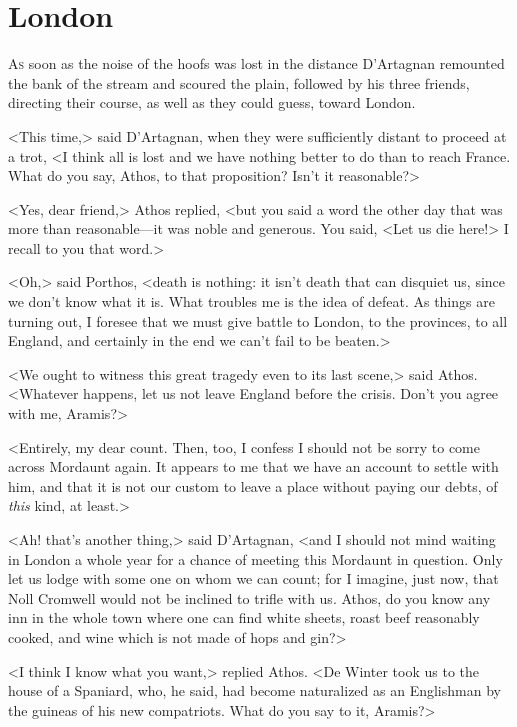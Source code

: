 \chapter{London}

 \lettrine{A}{s} soon as the noise of the hoofs was lost in the distance D'Artagnan remounted the bank of the stream and scoured the plain, followed by his three friends, directing their course, as well as they could guess, toward London.

\zz
<This time,> said D'Artagnan, when they were sufficiently distant to proceed at a trot, <I think all is lost and we have nothing better to do than to reach France. What do you say, Athos, to that proposition? Isn't it reasonable?>

<Yes, dear friend,> Athos replied, <but you said a word the other day that was more than reasonable—it was noble and generous. You said, <Let us die here!> I recall to you that word.>

<Oh,> said Porthos, <death is nothing: it isn't death that can disquiet us, since we don't know what it is. What troubles me is the idea of defeat. As things are turning out, I foresee that we must give battle to London, to the provinces, to all England, and certainly in the end we can't fail to be beaten.>

<We ought to witness this great tragedy even to its last scene,> said Athos. <Whatever happens, let us not leave England before the crisis. Don't you agree with me, Aramis?>

<Entirely, my dear count. Then, too, I confess I should not be sorry to come across Mordaunt again. It appears to me that we have an account to settle with him, and that it is not our custom to leave a place without paying our debts, of \emph{this} kind, at least.>

<Ah! that's another thing,> said D'Artagnan, <and I should not mind waiting in London a whole year for a chance of meeting this Mordaunt in question. Only let us lodge with some one on whom we can count; for I imagine, just now, that Noll Cromwell would not be inclined to trifle with us. Athos, do you know any inn in the whole town where one can find white sheets, roast beef reasonably cooked, and wine which is not made of hops and gin?>

<I think I know what you want,> replied Athos. <De Winter took us to the house of a Spaniard, who, he said, had become naturalized as an Englishman by the guineas of his new compatriots. What do you say to it, Aramis?>

